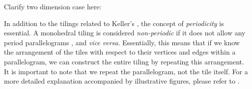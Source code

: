 \documentclass[../thesis.tex]{subfiles}
\begin{document}

Clarify two dimension case here:

In addition to the tilings related to Keller's , the concept of \emph{periodicity} is essential. A monohedral tiling is considered \emph{non-periodic} if it does not allow any period parallelograms \cite{penrosePentaplexityClassNonPeriodic1979}, and \emph{vice versa}. Essentially, this means that if we know the arrangement of the tiles with respect to their vertices and edges within a parallelogram, we can construct the entire tiling by repeating this arrangement. It is important to note that we repeat the parallelogram, not the tile itself. For a more detailed explanation accompanied by illustrative figures, please refer to \cite[p.29-30,147-149]{grunbaumTilingsPatterns1987}. 
\end{document}
